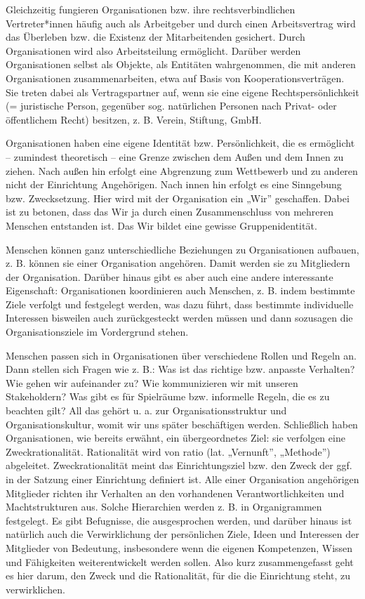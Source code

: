 \documentclass[
  letterpaper,
]{book}
\begin{document}
Gleichzeitig fungieren Organisationen bzw. ihre rechtsverbindlichen
Vertreter*innen häufig auch als Arbeitgeber und durch einen
Arbeitsvertrag wird das Überleben bzw. die Existenz der Mitarbeitenden
gesichert. Durch Organisationen wird also Arbeitsteilung ermöglicht.
Darüber werden Organisationen selbst als Objekte, als Entitäten
wahrgenommen, die mit anderen Organisationen zusammenarbeiten, etwa auf
Basis von Kooperationsverträgen. Sie treten dabei als Vertragspartner
auf, wenn sie eine eigene Rechtspersönlichkeit (= juristische Person,
gegenüber sog. natürlichen Personen nach Privat- oder öffentlichem
Recht) besitzen, z. B. Verein, Stiftung, GmbH.

Organisationen haben eine eigene Identität bzw. Persönlichkeit, die es
ermöglicht -- zumindest theoretisch -- eine Grenze zwischen dem Außen
und dem Innen zu ziehen. Nach außen hin erfolgt eine Abgrenzung zum
Wettbewerb und zu anderen nicht der Einrichtung Angehörigen. Nach innen
hin erfolgt es eine Sinngebung bzw. Zwecksetzung. Hier wird mit der
Organisation ein „Wir'' geschaffen. Dabei ist zu betonen, dass das Wir
ja durch einen Zusammenschluss von mehreren Menschen entstanden ist. Das
Wir bildet eine gewisse Gruppenidentität.

Menschen können ganz unterschiedliche Beziehungen zu Organisationen
aufbauen, z. B. können sie einer Organisation angehören. Damit werden
sie zu Mitgliedern der Organisation. Darüber hinaus gibt es aber auch
eine andere interessante Eigenschaft: Organisationen koordinieren auch
Menschen, z. B. indem bestimmte Ziele verfolgt und festgelegt werden,
was dazu führt, dass bestimmte individuelle Interessen bisweilen auch
zurückgesteckt werden müssen und dann sozusagen die Organisationsziele
im Vordergrund stehen.

Menschen passen sich in Organisationen über verschiedene Rollen und
Regeln an. Dann stellen sich Fragen wie z. B.: Was ist das richtige bzw.
anpasste Verhalten? Wie gehen wir aufeinander zu? Wie kommunizieren wir
mit unseren Stakeholdern? Was gibt es für Spielräume bzw. informelle
Regeln, die es zu beachten gilt? All das gehört u. a. zur
Organisationsstruktur und Organisationskultur, womit wir uns später
beschäftigen werden. Schließlich haben Organisationen, wie bereits
erwähnt, ein übergeordnetes Ziel: sie verfolgen eine Zweckrationalität.
Rationalität wird von ratio (lat. „Vernunft'', „Methode'') abgeleitet.
Zweckrationalität meint das Einrichtungsziel bzw. den Zweck der ggf. in
der Satzung einer Einrichtung definiert ist. Alle einer Organisation
angehörigen Mitglieder richten ihr Verhalten an den vorhandenen
Verantwortlichkeiten und Machtstrukturen aus. Solche Hierarchien werden
z. B. in Organigrammen festgelegt. Es gibt Befugnisse, die ausgesprochen
werden, und darüber hinaus ist natürlich auch die Verwirklichung der
persönlichen Ziele, Ideen und Interessen der Mitglieder von Bedeutung,
insbesondere wenn die eigenen Kompetenzen, Wissen und Fähigkeiten
weiterentwickelt werden sollen. Also kurz zusammengefasst geht es hier
darum, den Zweck und die Rationalität, für die die Einrichtung steht, zu
verwirklichen.
\end{document}
